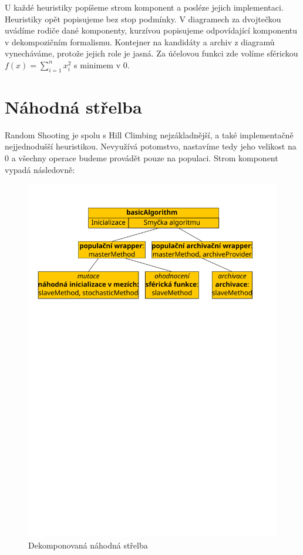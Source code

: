 
U každé heuristiky popíšeme strom komponent a posléze jejich implementaci. Heuristiky opět popisujeme bez stop podmínky. V diagramech za dvojtečkou uvádíme rodiče dané komponenty, kurzívou popisujeme odpovídající komponentu v dekompozičním formalismu. Kontejner na kandidáty a archiv z diagramů vynecháváme, protože jejich role je jasná. Za účelovou funkci zde volíme sférickou $f(x) = \sum_{i=1}^n x_i^2$ s minimem v $0$.

\section{Náhodná střelba}

Random Shooting je spolu s Hill Climbing nejzákladnější, a také implementačně nejjednodušší heuristikou. Nevyužívá potomstvo, nastavíme tedy jeho velikost na $0$ a všechny operace budeme provádět pouze na populaci. Strom komponent vypadá následovně:

\begin{figure}[h!]
\begin{center}
  \includegraphics[width=\textwidth]{img/RS}
  \caption{Dekomponovaná náhodná střelba}\label{RS dekomp}
  \end{center}
\end{figure}

